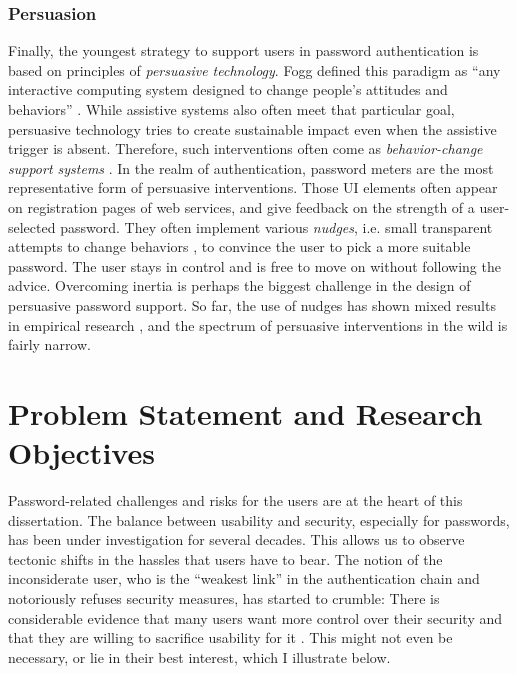 \subsubsection{Persuasion}
Finally, the youngest strategy to support users in password authentication is based on principles of \textit{persuasive technology}. Fogg defined this paradigm as ``any interactive computing system designed to change people's attitudes and behaviors'' \cite[p. 1]{Fogg2002Persuasive}. While assistive systems also often meet that particular goal, persuasive technology tries to create sustainable impact even when the assistive trigger is absent. Therefore, such interventions often come as \textit{behavior-change support systems} \cite{Oinas-Kukkonen2013BCSS}. In the realm of authentication, password meters are the most representative form of persuasive interventions. Those \gls{UI} elements often appear on registration pages of web services, and give feedback on the strength of a user-selected password. They often implement various \textit{nudges}, i.e. small transparent attempts to change behaviors \cite[p. 4]{Thaler2008Nudge}, to convince the user to pick a more suitable password. The user stays in control and is free to move on without following the advice. Overcoming inertia is perhaps the biggest challenge in the design of persuasive password support. So far, the use of nudges has shown mixed results in empirical research \cite{Egelman2013DoesMyPasswordGoUpToEleven, Renaud2017LessonsLearnedNudges, Ur2017DataDrivenPWMeter}, and the spectrum of persuasive interventions in the wild is fairly narrow. 

\section{Problem Statement and Research Objectives}
Password-related challenges and risks for the users are at the heart of this dissertation. The balance between usability and security, especially for passwords, has been under investigation for several decades. This allows us to observe tectonic shifts in the hassles that users have to bear. 
The notion of the inconsiderate user, who is the ``weakest link'' in the authentication chain and notoriously refuses security measures, has started to crumble: There is considerable evidence that many users want more control over their security and that they are willing to sacrifice usability for it \cite{Kessem2018IBMFutureIdentity}. This might not even be necessary, or lie in their best interest, which I illustrate below. 
